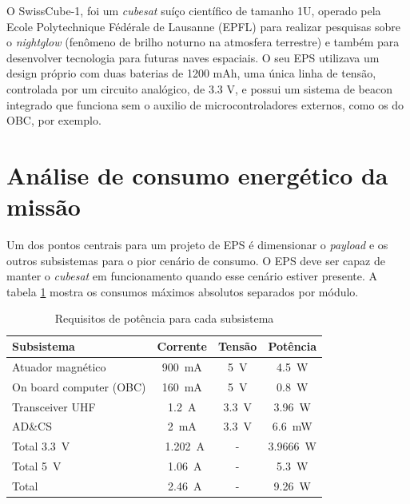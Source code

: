 O SwissCube-1, \cite{swisscube_ref}\cite{lessons_swisscube_ref} foi um \textit{cubesat} suíço científico de tamanho 1U, operado pela Ecole Polytechnique Fédérale de Lausanne (EPFL) para realizar pesquisas sobre o \textit{nightglow} (fenômeno de brilho noturno na atmosfera terrestre) e também para desenvolver tecnologia para futuras naves espaciais. O seu EPS utilizava um design próprio com duas baterias de 1200 mAh, uma única linha de tensão, controlada por um circuito analógico, de 3.3 V,  e possui um sistema de beacon integrado que funciona sem o auxilio de microcontroladores externos, como os do OBC, por exemplo.

\section{Análise de consumo energético da missão}

Um dos pontos centrais para um projeto de EPS é dimensionar o \textit{payload} e os outros subsistemas para o pior cenário de consumo. O EPS deve ser capaz de manter o \textit{cubesat} em funcionamento quando esse cenário estiver presente. A tabela \ref{tab:requisites_modules} mostra os consumos máximos absolutos separados por módulo.

\begin{table}[!ht]
    \centering
    \begin{tabular}{l|ccc}
        Subsistema & Corrente & Tensão & Potência \\
        \hline
        Atuador magnético & \SI{900}{\milli\ampere} & \SI{5}{\volt} & \SI{4,5}{\watt}\\
        On board computer (OBC) & \SI{160}{\milli\ampere} & \SI{5}{\volt} & \SI{0.8}{\watt}\\
        Transceiver UHF & \SI{1.2}{\ampere} & \SI{3.3}{\volt} & \SI{3.96}{\watt}\\
        AD\&CS & \SI{2}{\milli\ampere} & \SI{3.3}{\volt} & \SI{6.6}{\milli\watt}\\
        \hline
        Total \SI{3.3}{\volt} & ~\SI{1.202}{\ampere} & - & \SI{3.9666}{\watt}\\
        Total \SI{5}{\volt} & ~\SI{1.06}{\ampere} & - & \SI{5.3}{\watt}\\ \hline
        Total & ~\SI{2.46}{\ampere} & - & \SI{9.26}{\watt}\\
    \end{tabular}
    \caption{Requisitos de potência para cada subsistema}
    \label{tab:requisites_modules}
\end{table}

